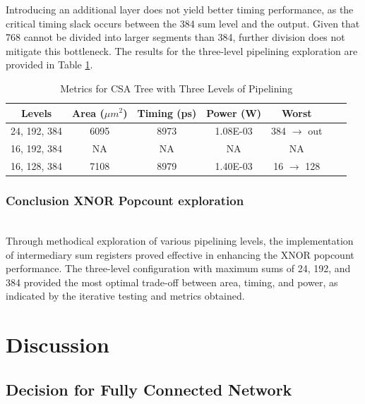 \documentclass[conference]{IEEEtran}
\begin{document}
Introducing an additional layer does not yield better timing performance, as the critical timing slack occurs between the 384 sum level and the output. Given that 768 cannot be divided into larger segments than 384, further division does not mitigate this bottleneck. 
The results for the three-level pipelining exploration are provided in Table \ref{tab:three_level}.

\begin{table}[h]
    \centering
    \caption{Metrics for CSA Tree with Three Levels of Pipelining}
    \label{tab:three_level}
    \begin{tabular}{@{}ccccccc@{}}
        \toprule
        \textbf{Levels} & \textbf{Area ($\mu m^2$)} & \textbf{Timing (ps)} & \textbf{Power (W)} & \textbf{Worst} \\
        \midrule
        24, 192, 384 & 6095 & 8973 & 1.08E-03 & 384 $\rightarrow$ out\\
        16, 192, 384 & NA & NA & NA & NA \\
        16, 128, 384 & 7108 & 8979 & 1.40E-03 & 16 $\rightarrow$ 128 \\
        \bottomrule
    \end{tabular}
\end{table}

\subsubsection{Conclusion XNOR Popcount exploration}
\hfill\\

Through methodical exploration of various pipelining levels, the implementation of intermediary sum registers proved effective in enhancing the XNOR popcount performance. The three-level configuration with maximum sums of 24, 192, and 384 provided the most optimal trade-off between area, timing, and power, as indicated by the iterative testing and metrics obtained.





\section{Discussion}
\label{sec:discussion}

\subsection{Decision for Fully Connected Network}
\end{document}
